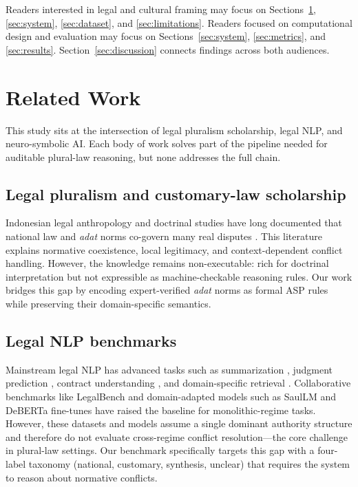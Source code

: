 \documentclass[pdflatex,sn-basic,Numbered]{sn-jnl}
\begin{document}
Readers interested in legal and cultural framing may focus on Sections~\ref{sec:related}, \ref{sec:system}, \ref{sec:dataset}, and \ref{sec:limitations}.
Readers focused on computational design and evaluation may focus on Sections~\ref{sec:system}, \ref{sec:metrics}, and \ref{sec:results}.
Section~\ref{sec:discussion} connects findings across both audiences.

\section{Related Work}\label{sec:related}

This study sits at the intersection of legal pluralism scholarship, legal NLP, and neuro-symbolic AI.
Each body of work solves part of the pipeline needed for auditable plural-law reasoning, but none addresses the full chain.

\subsection{Legal pluralism and customary-law scholarship}\label{subsec:pluralism}

Indonesian legal anthropology and doctrinal studies have long documented that national law and \textit{adat} norms co-govern many real disputes \cite{hooker1978adat,burns2004leiden}.
This literature explains normative coexistence, local legitimacy, and context-dependent conflict handling.
However, the knowledge remains non-executable: rich for doctrinal interpretation but not expressible as machine-checkable reasoning rules.
Our work bridges this gap by encoding expert-verified \textit{adat} norms as formal ASP rules while preserving their domain-specific semantics.

\subsection{Legal NLP benchmarks}\label{subsec:legalnlp}

Mainstream legal NLP has advanced tasks such as summarization \cite{sie-etal-2024-summarizing,tyss-etal-2024-lexsumm}, judgment prediction \cite{nigam-etal-2024-rethinking,liu-etal-2024-enhancing-legal,xie-etal-2024-clc}, contract understanding \cite{mali-etal-2024-information,narendra-etal-2024-enhancing,kwak-etal-2024-classify}, and domain-specific retrieval \cite{hou-etal-2024-gaps,taranukhin-etal-2024-empowering}.
Collaborative benchmarks like LegalBench \cite{guha2023legalbench} and domain-adapted models such as SaulLM \cite{colombo2024saullm} and DeBERTa fine-tunes \cite{tran-etal-2024-deberta} have raised the baseline for monolithic-regime tasks.
However, these datasets and models assume a single dominant authority structure and therefore do not evaluate cross-regime conflict resolution---the core challenge in plural-law settings.
Our benchmark specifically targets this gap with a four-label taxonomy (national, customary, synthesis, unclear) that requires the system to reason about normative conflicts.
\end{document}

